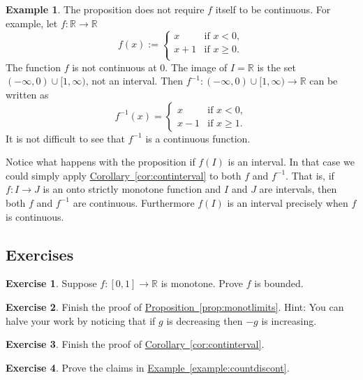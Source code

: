 \documentclass[12pt]{book}
\newcommand{\R}{{\mathbb{R}}}
\theoremstyle{plain}
\theoremstyle{remark}
\theoremstyle{definition}
\theoremstyle{exercise}
\newtheorem{exercise}{Exercise}[section]
\theoremstyle{example}
\newtheorem{example}[thm]{Example}
\newcommand{\exampleref}[1]{\hyperref[#1]{Example~\ref*{#1}}}
\newcommand{\propref}[1]{\hyperref[#1]{Proposition~\ref*{#1}}}
\newcommand{\corref}[1]{\hyperref[#1]{Corollary~\ref*{#1}}}
\begin{document}
\begin{example}
The proposition does not require $f$ itself to be continuous.  For example, let
$f \colon \R \to \R$
\begin{equation*}
f(x) :=
\begin{cases}
x & \text{if $x < 0$}, \\
x+1 & \text{if $x \geq 0$}. \\
\end{cases}
\end{equation*}
The function $f$ is not continuous at $0$.
The image of $I = \R$ is the set 
$(-\infty,0)\cup [1,\infty)$, not an interval.
Then $f^{-1} \colon (-\infty,0)\cup [1,\infty)
\to \R$ can be written as
\begin{equation*}
f^{-1}(x) =
\begin{cases}
x & \text{if $x < 0$}, \\
x-1 & \text{if $x \geq 1$}. 
\end{cases}
\end{equation*}
It is not difficult to see that $f^{-1}$ is a continuous function.
\end{example}

Notice what happens with the proposition if $f(I)$ is an interval.  In that case we could simply
apply \corref{cor:continterval} to both $f$ and $f^{-1}$.  That is, if
$f \colon I \to J$ is an onto strictly monotone function and $I$ and $J$ are intervals,
then both $f$ and $f^{-1}$ are continuous.  Furthermore $f(I)$ is an
interval precisely when $f$ is continuous.

\subsection{Exercises}

\begin{exercise}
Suppose $f \colon [0,1] \to \R$ is monotone.  Prove $f$ is bounded.
\end{exercise}

\begin{exercise}
Finish the proof of \propref{prop:monotlimits}.
Hint: You can halve your work by noticing that if $g$ is decreasing
then $-g$ is increasing.
\end{exercise}

\begin{exercise}
Finish the proof of \corref{cor:continterval}.
\end{exercise}

\begin{exercise}
Prove the claims in \exampleref{example:countdiscont}.
\end{exercise}
\end{document}
